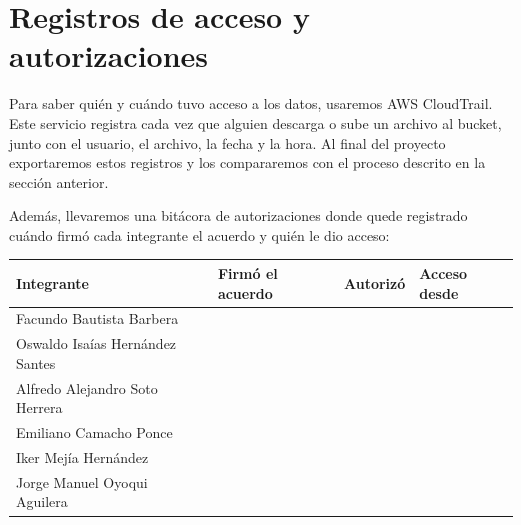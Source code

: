 \section{Registros de acceso y autorizaciones}

Para saber quién y cuándo tuvo acceso a los datos, usaremos AWS CloudTrail. Este servicio registra cada vez que alguien descarga o sube un archivo al bucket, junto con el usuario, el archivo, la fecha y la hora. Al final del proyecto exportaremos estos registros y los compararemos con el proceso descrito en la sección anterior.

Además, llevaremos una bitácora de autorizaciones donde quede registrado cuándo firmó cada integrante el acuerdo y quién le dio acceso:

\begin{table}[htbp]
  \centering
  \small
  \begin{tabularx}{\textwidth}{>{\raggedright\arraybackslash}p{}XXX}
    \toprule
    Integrante & Firmó el acuerdo & Autorizó & Acceso desde \\
    \midrule
    Facundo Bautista Barbera & & & \\
    Oswaldo Isaías Hernández Santes & & & \\
    Alfredo Alejandro Soto Herrera & & & \\
    Emiliano Camacho Ponce & & & \\
    Iker Mejía Hernández & & & \\
    Jorge Manuel Oyoqui Aguilera & & & \\
    \bottomrule
  \end{tabularx}
\end{table}
